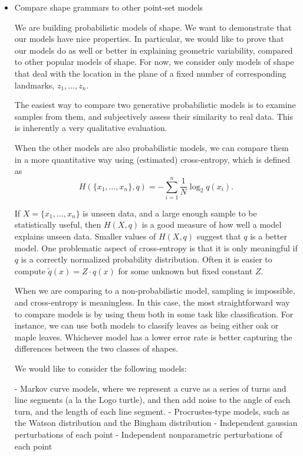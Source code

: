 

\begin{itemize}

\item Compare shape grammars to other point-set models

We are building probabilistic models of shape. We want to demonstrate
that our models have nice properties. In particular, we would like to
prove that our models do as well or better in explaining geometric
variability, compared to other popular models of shape. For now, we
consider only models of shape that deal with the location in the plane
of a fixed number of corresponding landmarks, $z_1, \dots, z_n$.

The easiest way to compare two generative probabilistic models is to
examine samples from them, and subjectively assess their similarity to
real data. This is inherently a very qualitative evaluation.

When the other models are also probabilistic models, we can compare
them in a more quantitative way using (estimated) cross-entropy, which
is defined as
$$H(\{x_1,\dots,x_n\}, q) = - \sum_{i=1}^n \frac{1}{N} \log_2 q(x_i).$$

If $X = \{x_1,\dots,x_n\}$ is unseen data, and a large enough sample
to be statistically useful, then $H(X,q)$ is a good measure of how
well a model explains unseen data. Smaller values of $H(X,q)$ suggest
that $q$ is a better model. One problematic aspect of cross-entropy is
that it is only meaningful if $q$ is a correctly normalized
probability distribution. Often it is easier to compute
$\widetilde{q}(x) = Z\cdot q(x)$ for some unknown but fixed constant
$Z$.

When we are comparing to a non-probabilistic model, sampling is
impossible, and cross-entropy is meaningless. In this case, the most
straightforward way to compare models is by using them both in some
task like classification. For instance, we can use both models to
classify leaves as being either oak or maple leaves. Whichever model
has a lower error rate is better capturing the differences between the
two classes of shapes.

We would like to consider the following models:

  - Markov curve models, where we represent a curve as a series of
    turns and line segments (a la the Logo turtle), and then add noise
    to the angle of each turn, and the length of each line segment.
  - Procrustes-type models, such as the Watson distribution and the
    Bingham distribution
  - Independent gaussian perturbations of each point
  - Independent nonparametric perturbations of each point


\end{itemize}
